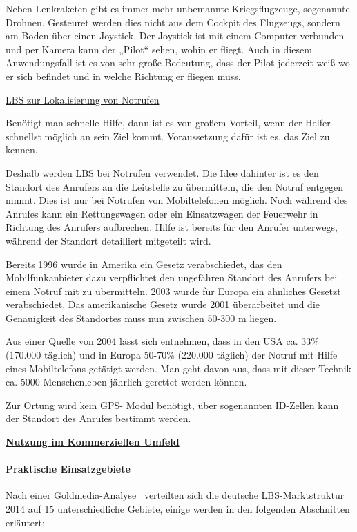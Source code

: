 Neben Lenkraketen gibt es immer mehr unbemannte Kriegsflugzeuge, sogenannte Drohnen. Gesteuret werden dies nicht aus dem Cockpit des Flugzeugs, sondern am Boden über einen Joystick. Der Joystick ist mit einem Computer verbunden und per Kamera kann der „Pilot“ sehen, wohin er fliegt. Auch in diesem Anwendungsfall ist es von sehr große Bedeutung, dass der Pilot jederzeit weiß wo er sich befindet und in welche Richtung er fliegen muss. \cite{FokusRaketen}

\underline{LBS zur Lokalisierung von Notrufen}

Benötigt man schnelle Hilfe, dann ist es von großem Vorteil, wenn der Helfer schnellst möglich an sein Ziel kommt. Voraussetzung dafür ist es, das Ziel zu kennen.

Deshalb werden LBS bei Notrufen verwendet. Die Idee dahinter ist es den Standort des Anrufers an die Leitstelle zu übermitteln, die den Notruf entgegen nimmt. Dies ist nur bei Notrufen von Mobiltelefonen möglich. Noch während des Anrufes kann ein Rettungswagen oder ein Einsatzwagen der Feuerwehr in Richtung des Anrufers aufbrechen. Hilfe ist bereits für den Anrufer unterwegs, während der Standort detailliert mitgeteilt wird.

Bereits 1996 wurde in Amerika ein Gesetz verabschiedet, das den Mobilfunkanbieter dazu verpflichtet den ungefähren Standort des Anrufers bei einem Notruf mit zu übermitteln. 2003 wurde für Europa ein ähnliches Gesetzt verabschiedet. Das amerikanische Gesetz wurde 2001 überarbeitet und die Genauigkeit des Standortes muss nun zwischen 50-300 m liegen.  

Aus einer Quelle von 2004 lässt sich entnehmen, dass in den USA ca. 33\% (170.000 täglich) und in Europa 50-70\% (220.000 täglich) der Notruf mit Hilfe eines Mobiltelefons getätigt werden. Man geht davon aus, dass mit dieser Technik ca. 5000 Menschenleben jährlich gerettet werden können.

Zur Ortung wird kein GPS- Modul benötigt, über sogenannten ID-Zellen kann der Standort des Anrufes bestimmt werden.\cite{Schiller2004}




\textbf{ \underline{Nutzung im Kommerziellen Umfeld } }

\paragraph{Praktische Einsatzgebiete}
Nach einer Goldmedia-Analyse~\cite[S.9]{goldmedia:lbs} verteilten sich die deutsche LBS-Marktstruktur 2014 auf 15 unterschiedliche Gebiete, einige werden in den folgenden Abschnitten erläutert:\\

